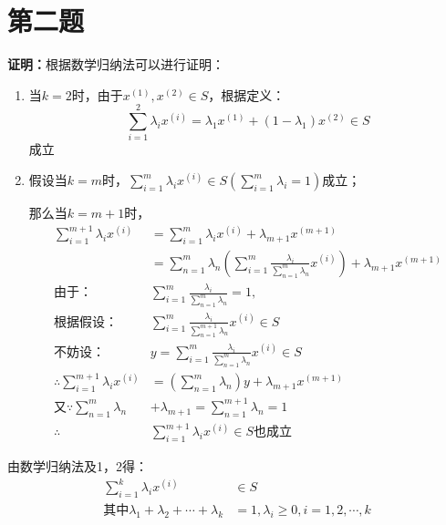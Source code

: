 \documentclass[a4paper]{article}
\begin{document}
\section{第二题}
\textbf{证明：}根据数学归纳法可以进行证明：
\begin{enumerate}
	\item 当$k=2$时，由于$x^{(1)},x^{(2)}\in S$，根据定义：
	\begin{equation}
	\sum_{i=1}^{2}\lambda_ix^{(i)}=\lambda_1x^{(1)}+(1-\lambda_1)x^{(2)} \in S
	\end{equation}
	成立
	\item 假设当$k=m$时，$\sum_{i=1}^{m}\lambda_ix^{(i)}\in S(\sum_{i=1}^{m}\lambda_{i}=1)$成立；
	
	那么当$k=m+1$时，
	\begin{equation}
	\begin{aligned}
	\sum_{i=1}^{m+1}\lambda_ix^{(i)}&=\sum_{i=1}^{m}\lambda_ix^{(i)}+\lambda_{m+1}x^{(m+1)} \\
	&=\sum_{n=1}^{m}\lambda_{n} \left( \sum_{i=1}^{m}\frac{\lambda_i}{\sum_{n=1}^{m}\lambda_{n}}x^{(i)}\right)+\lambda_{m+1}x^{(m+1)} \\
	\mbox{由于：}&\sum_{i=1}^{m}\frac{\lambda_i}{\sum_{n=1}^{m}\lambda_{n}}=1,\\
	\mbox{根据假设：}&\sum_{i=1}^{m}\frac{\lambda_i}{\sum_{n=1}^{m+1}\lambda_{n}}x^{(i)} \in S \\
	\mbox{不妨设：}&y=\sum_{i=1}^{m}\frac{\lambda_i}{\sum_{n=1}^{m}\lambda_{n}}x^{(i)} \in S \\
	\therefore \sum_{i=1}^{m+1}\lambda_ix^{(i)}&=\left(\sum_{n=1}^{m}\lambda_{n}\right) y +\lambda_{m+1}x^{(m+1)} \\
	又\because \sum_{n=1}^{m}\lambda_{n} & + \lambda_{m+1} = \sum_{n=1}^{m+1}\lambda_{n} = 1 \\
	\therefore &\sum_{i=1}^{m+1}\lambda_ix^{(i)}\in S\mbox{也成立}
	\end{aligned}
	\end{equation}
\end{enumerate}
由数学归纳法及1，2得：
\begin{equation}
\begin{aligned}
\sum_{i=1}^{k}\lambda_ix^{(i)}&\in S \\
\mbox{其中}\lambda_1+\lambda_2+\cdots+\lambda_k&=1,\lambda_{i}\ge 0,i=1,2,\cdots,k
\end{aligned}
\end{equation}

\newpage
\end{document}

